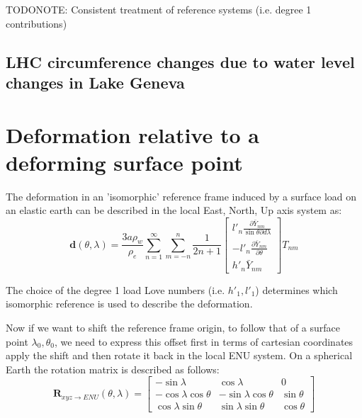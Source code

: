 \documentclass[a4paper,10pt,twoside,openany]{article}
\begin{document}
TODONOTE: Consistent treatment of reference systems (i.e. degree 1 contributions)











\subsection{LHC circumference changes due to water level changes in Lake Geneva}

\appendix
\section{Deformation relative to a deforming surface point}
The deformation in an 'isomorphic' reference frame induced by a surface load on an elastic earth can be described in the local East, North, Up axis system as:
\begin{equation}
\textbf{d}(\theta,\lambda)=\frac{3a\rho_{w}}{\rho_{e}}\sum_{n=1}^{\infty}\sum_{m=-n}^{n}\frac{1}{2n+1}\left[\begin{array}{c}
    l'_{n}\frac{\partial \bar{Y}_{nm}}{\sin \theta \partial
      d\lambda}\\-l'_{n}\frac{\partial \bar{Y}_{nm}}{\partial \theta}\\h'_{n}\bar{Y}_{nm}\end{array}\right]T_{nm}
\end{equation}

The choice of the degree 1 load Love numbers (i.e. $h'_{1},l'_{1}$) determines which isomorphic reference is used to describe the deformation.

Now if we want to shift the reference frame origin, to follow that of a surface point $\lambda_{0},\theta_{0}$, we need to express this offset first in terms of cartesian coordinates apply the shift and then rotate it back in the local ENU system. On a spherical Earth the rotation matrix is described as follows:
\begin{equation}
\textbf{R}_{xyz\rightarrow ENU}(\theta,\lambda)=\left[\begin{array}{ccc}-\sin\lambda&\cos\lambda&0\\-\cos\lambda\cos\theta&-\sin\lambda\cos\theta&\sin\theta\\\cos\lambda\sin\theta&\sin\lambda\sin\theta&\cos\theta\end{array}\right]
\end{equation}
\end{document}
